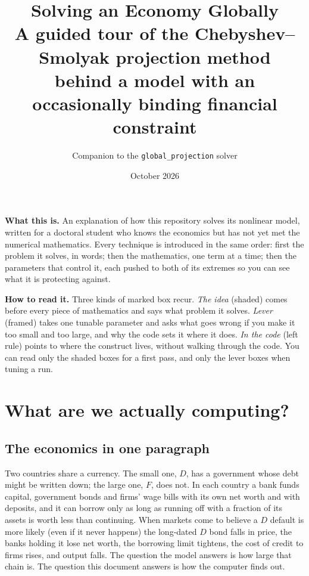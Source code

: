 \documentclass[10pt,a4paper]{article}
\title{\textbf{Solving an Economy Globally}\\[0.4em]
\large A guided tour of the Chebyshev--Smolyak projection method\\
behind a model with an occasionally binding financial constraint}
\author{Companion to the \texttt{global\_projection} solver}
\date{October 2026}
\theoremstyle{plain}
\theoremstyle{remark}
\begin{document}
\maketitle

\begin{center}
\begin{minipage}{0.9\textwidth}\small
\noindent\textbf{What this is.} An explanation of how this repository solves its nonlinear
model, written for a doctoral student who knows the economics but has not yet met the
numerical mathematics. Every technique is introduced in the same order: first the
problem it solves, in words; then the mathematics, one term at a time; then the
parameters that control it, each pushed to both of its extremes so you can see what it
is protecting against.

\medskip
\noindent\textbf{How to read it.} Three kinds of marked box recur.
\emph{The idea} (shaded) comes before every piece of mathematics and says what problem it
solves. \emph{Lever} (framed) takes one tunable parameter and asks what goes wrong if you
make it too small and too large, and why the code sets it where it does. \emph{In the code}
(left rule) points to where the construct lives, without walking through the code. You can
read only the shaded boxes for a first pass, and only the lever boxes when tuning a run.
\end{minipage}
\end{center}

{\small\setcounter{tocdepth}{1}\tableofcontents}

\section{What are we actually computing?}

\subsection{The economics in one paragraph}

Two countries share a currency. The small one, $D$, has a government whose debt might be
written down; the large one, $F$, does not. In each country a bank funds capital,
government bonds and firms' wage bills with its own net worth and with deposits, and it
can borrow only as long as running off with a fraction of its assets is worth less than
continuing. When markets come to believe a $D$ default is more likely (even if it never
happens) the long-dated $D$ bond falls in price, the banks holding it lose net worth,
the borrowing limit tightens, the cost of credit to firms rises, and output falls. The
question the model answers is how large that chain is. The question this document answers
is how the computer finds out.
\end{document}
